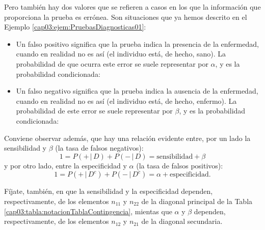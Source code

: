 Pero también hay dos valores que se refieren a casos en los que la información que proporciona la prueba es errónea. Son situaciones que ya hemos descrito en el Ejemplo \ref{cap03:ejem:PruebasDiagnosticas01}:
     \begin{itemize}
        \item Un {\sf falso positivo} significa que la prueba indica la presencia de la enfermedad, cuando en realidad no es así (el individuo está, de hecho, sano). La probabilidad de que ocurra este error se suele representar por $\alpha$, y es la probabilidad condicionada:
            \begin{center}
            \end{center}

        \item Un {\sf falso negativo} significa que la prueba indica la ausencia de la enfermedad, cuando en realidad no es así (el individuo está, de hecho, enfermo). La probabilidad de este error se suele representar por $\beta$, y es la probabilidad condicionada:
            \begin{center}
            \end{center}
     \end{itemize}
Conviene observar además, que hay una relación evidente entre, por un lado la sensibilidad  y $\beta$ (la tasa de falsos negativos):
\[1=P(+\,|\,D)+P(-\,|\,D)=\mbox{sensibilidad}+\beta\]
y por otro lado, entre la especificidad y $\alpha$ (la tasa de falsos positivos):
\[1=P(+\,|\,D^c)+P(-\,|\,D^c)=\alpha+\mbox{especificidad}.\]

Fíjate, también, en que la sensibilidad y la especificidad dependen, respectivamente, de los elementos $n_{11}$ y $n_{22}$ de la diagonal principal de la Tabla \ref{cap03:tabla:notacionTablaContingencia}, mientas que $\alpha$ y $\beta$ dependen, respectivamente, de los elementos $n_{12}$ y $n_{21}$ de la diagonal secundaria.

